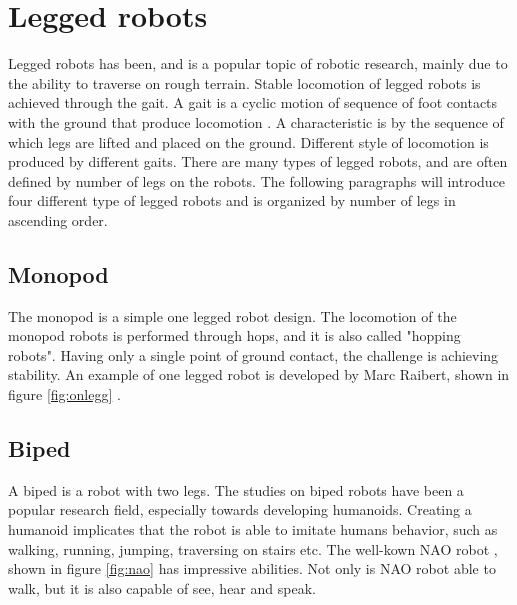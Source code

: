 \documentclass[USenglish]{ifimaster}  %
\begin{document}
\section{Legged robots}
Legged robots has been, and is a popular topic of robotic research, mainly due to the ability to traverse on rough terrain. Stable locomotion of legged robots is achieved through the gait. A gait is a cyclic motion of sequence of foot contacts with the ground that produce locomotion \cite{1641859}. A characteristic is by the sequence of which legs are lifted and placed on the ground. Different style of locomotion is produced by different gaits. There are many types of legged robots, and are often defined by number of legs on the robots. The following paragraphs will introduce four different type of legged robots and is organized by number of legs in ascending order.




\subsection{Monopod}
The monopod is a simple one legged robot design. The locomotion of the monopod robots is performed through hops, and it is also called "hopping robots". Having only a single point of ground contact, the challenge is achieving stability. An example of one legged robot is developed by Marc Raibert, shown in figure \ref{fig:onlegg} \cite{Raibert:1986:LR:5948.5950}.

\subsection{Biped}
A biped is a robot with two legs. The studies on biped robots have been a popular research field, especially towards developing humanoids. Creating a humanoid implicates that the robot is able to imitate humans behavior, such as walking, running, jumping, traversing on stairs etc. The well-kown NAO robot \cite{NAO}, shown in figure \ref{fig:nao} has impressive abilities. Not only is NAO robot able to walk, but it is also capable of see, hear and speak. 
\end{document}
